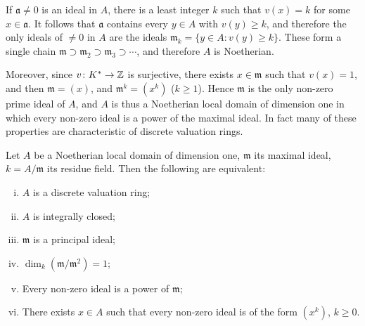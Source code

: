 If $\mathfrak{a} \neq 0$ is an ideal in $A$, there is a least integer $k$ such that $v(x) = k$ for some $x \in \mathfrak{a}$. It follows that $\mathfrak{a}$ contains every $y \in A$ with $v(y) \geq k$, and therefore the only ideals of $\neq 0$ in $A$ are the ideals $\mathfrak{m}_k = \{y \in A : v(y) \geq k\}$. These form a single chain $\mathfrak{m} \supset \mathfrak{m}_2 \supset \mathfrak{m}_3 \supset \cdots$, and therefore $A$ is Noetherian.

Moreover, since $v \colon K^* \to \mathbb{Z}$ is surjective, there exists $x \in \mathfrak{m}$ such that $v(x) = 1$, and then $\mathfrak{m} = (x)$, and $\mathfrak{m}^k = (x^k)$ ($k \geq 1$). Hence $\mathfrak{m}$ is the only non-zero prime ideal of $A$, and $A$ is thus a Noetherian local domain of dimension one in which every non-zero ideal is a power of the maximal ideal. In fact many of these properties are characteristic of discrete valuation rings.

\begin{proposition}\label{prop:dvr-equivalent}
Let $A$ be a Noetherian local domain of dimension one, $\mathfrak{m}$ its maximal ideal, $k = A/\mathfrak{m}$ its residue field. Then the following are equivalent:
\begin{enumerate}[i)]
    \item $A$ is a discrete valuation ring;
    \item $A$ is integrally closed;
    \item $\mathfrak{m}$ is a principal ideal;
    \item $\dim_k(\mathfrak{m}/\mathfrak{m}^2) = 1$;
    \item Every non-zero ideal is a power of $\mathfrak{m}$;
    \item There exists $x \in A$ such that every non-zero ideal is of the form $(x^k)$, $k \geq 0$.
\end{enumerate}
\end{proposition}

